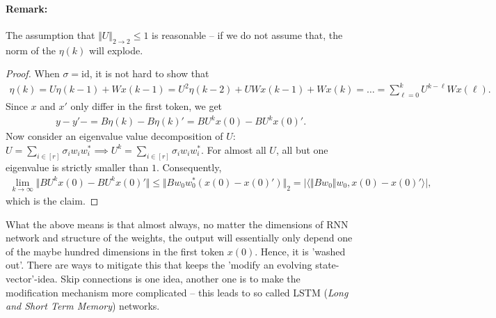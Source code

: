 \documentclass{article}
\newcommand{\id}{\mathrm{id}}
\newcommand{\sprod}[1]{\langle #1 \rangle}
\newcommand{\abs}[1]{\vert #1 \vert}
\newcommand{\norm}[1]{\Vert #1 \Vert}
\begin{document}
\paragraph{Remark:} The assumption that $\norm{U}_{2\to 2}\leq 1$ is reasonable -- if we do not assume that, the norm of the $\eta(k)$ will explode. 
\begin{proof}
    When $\sigma=\id$, it is not hard to show that
    \begin{align*}
        \eta(k) = U\eta(k-1) + Wx(k-1) = U^2\eta(k-2) + UWx(k-1) + Wx(k) = \dots = \sum_{\ell=0}^k U^{k-\ell}Wx(\ell).
    \end{align*}
    Since $x$ and $x'$ only differ in the first token, we get
    \begin{align*}
        y-y'- = B\eta(k)-B\eta(k)' = BU^kx(0) - BU^kx(0)'.
    \end{align*}
    Now consider an eigenvalue value decomposition of $U$: $U = \sum_{i \in [r]} \sigma_i w_iw_i^* \implies U^k = \sum_{i \in [r]} \sigma_i w_iw_i^*$. For almost all $U$, all but one eigenvalue is strictly smaller than $1$. Consequently,
    \begin{align*}
        \lim_{k \to \infty } \norm{BU^kx(0) - BU^kx(0)'} \leq  \norm{Bw_0w_0^*(x(0)-x(0)')}_2 = \abs{\sprod{\norm{Bw_0}w_0,x(0)-x(0)'}},
    \end{align*}
    which is the claim.
\end{proof}
What the above means is that almost always, no matter the dimensions of RNN network and structure of the weights, the output will essentially only depend one of the maybe hundred dimensions in the first token $x(0)$. Hence, it is 'washed out'. There are ways to mitigate this that keeps the 'modify an evolving state-vector'-idea. Skip connections is one idea, another one is to make the modification mechanism more complicated -- this leads to so called LSTM (\emph{Long and Short Term Memory}) networks. 
\end{document}
